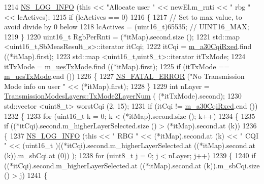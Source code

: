 \begin{DoxyCode}
1214       \hyperlink{group__logging_gafbd73ee2cf9f26b319f49086d8e860fb}{NS\_LOG\_INFO} (\textcolor{keyword}{this} << \textcolor{stringliteral}{"Allocate user "} << newEl.m\_rnti << \textcolor{stringliteral}{" rbg "} << lcActives);
1215       \textcolor{keywordflow}{if} (lcActives == 0)
1216         \{
1217           \textcolor{comment}{// Set to max value, to avoid divide by 0 below}
1218           lcActives = (uint16\_t)65535; \textcolor{comment}{// UINT16\_MAX;}
1219         \}
1220       uint16\_t RgbPerRnti = (*itMap).second.size ();
1221       std::map <uint16\_t,SbMeasResult\_s>::iterator itCqi;
1222       itCqi = \hyperlink{classns3_1_1PfFfMacScheduler_a4bf7d1844112028aa3f7bc21e580a7bd}{m\_a30CqiRxed}.find ((*itMap).first);
1223       std::map <uint16\_t,uint8\_t>::iterator itTxMode;
1224       itTxMode = \hyperlink{classns3_1_1PfFfMacScheduler_afde3fb192a83a5fafc27ed9a0df82de9}{m\_uesTxMode}.find ((*itMap).first);
1225       \textcolor{keywordflow}{if} (itTxMode == \hyperlink{classns3_1_1PfFfMacScheduler_afde3fb192a83a5fafc27ed9a0df82de9}{m\_uesTxMode}.end ())
1226         \{
1227           \hyperlink{group__fatal_ga5131d5e3f75d7d4cbfd706ac456fdc85}{NS\_FATAL\_ERROR} (\textcolor{stringliteral}{"No Transmission Mode info on user "} << (*itMap).first);
1228         \}
1229       \textcolor{keywordtype}{int} nLayer = \hyperlink{classns3_1_1TransmissionModesLayers_a31f608b7bfaa77440fe4cb85ad035329}{TransmissionModesLayers::TxMode2LayerNum} (
      (*itTxMode).second);
1230       std::vector <uint8\_t> worstCqi (2, 15);
1231       \textcolor{keywordflow}{if} (itCqi != \hyperlink{classns3_1_1PfFfMacScheduler_a4bf7d1844112028aa3f7bc21e580a7bd}{m\_a30CqiRxed}.end ())
1232         \{
1233           \textcolor{keywordflow}{for} (uint16\_t k = 0; k < (*itMap).second.size (); k++)
1234             \{
1235               \textcolor{keywordflow}{if} ((*itCqi).second.m\_higherLayerSelected.size () > (*itMap).second.at (k))
1236                 \{
1237                   \hyperlink{group__logging_gafbd73ee2cf9f26b319f49086d8e860fb}{NS\_LOG\_INFO} (\textcolor{keyword}{this} << \textcolor{stringliteral}{" RBG "} << (*itMap).second.at (k) << \textcolor{stringliteral}{" CQI "} << (uint16\_t
      )((*itCqi).second.m\_higherLayerSelected.at ((*itMap).second.at (k)).m\_sbCqi.at (0)) );
1238                   \textcolor{keywordflow}{for} (uint8\_t j = 0; j < nLayer; j++)
1239                     \{
1240                       \textcolor{keywordflow}{if} ((*itCqi).second.m\_higherLayerSelected.at ((*itMap).second.at (k)).m\_sbCqi.size ()
       > j)
1241                         \{

\end{DoxyCode}
